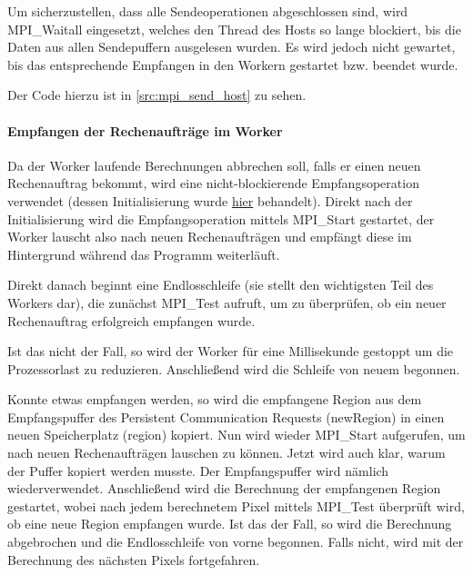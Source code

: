 Um sicherzustellen, dass alle Sendeoperationen abgeschlossen sind, wird MPI\_Waitall eingesetzt, welches den Thread des Hosts so lange blockiert, bis die Daten aus allen Sendepuffern ausgelesen wurden. Es wird jedoch nicht gewartet, bis das entsprechende Empfangen in den Workern gestartet bzw. beendet wurde.

Der Code hierzu ist in \autoref{src:mpi_send_host} zu sehen.

\begin{figure}[h!]
	
\end{figure}

\paragraph{Empfangen der Rechenaufträge im Worker}\label{para:recv_worker}

Da der Worker laufende Berechnungen abbrechen soll, falls er einen neuen Rechenauftrag bekommt, wird eine nicht-blockierende Empfangsoperation verwendet (dessen Initialisierung wurde \hyperref[para:persistent_init]{hier} behandelt). Direkt nach der Initialisierung wird die Empfangsoperation mittels MPI\_Start gestartet, der Worker lauscht also nach neuen Rechenaufträgen und empfängt diese im Hintergrund während das Programm weiterläuft.

Direkt danach beginnt eine Endlosschleife (sie stellt den wichtigsten Teil des Workers dar), die zunächst MPI\_Test aufruft, um zu überprüfen, ob ein neuer Rechenauftrag erfolgreich empfangen wurde.

Ist das nicht der Fall, so wird der Worker für eine Millisekunde gestoppt um die Prozessorlast zu reduzieren. Anschließend wird die Schleife von neuem begonnen.

Konnte etwas empfangen werden, so wird die empfangene Region aus dem Empfangspuffer des Persistent Communication Requests (newRegion) in einen neuen Speicherplatz (region) kopiert. Nun wird wieder MPI\_Start aufgerufen, um nach neuen Rechenaufträgen lauschen zu können. Jetzt wird auch klar, warum der Puffer kopiert werden musste. Der Empfangspuffer wird nämlich wiederverwendet. Anschließend wird die Berechnung der empfangenen Region gestartet, wobei nach jedem berechnetem Pixel mittels MPI\_Test überprüft wird, ob eine neue Region empfangen wurde. Ist das der Fall, so wird die Berechnung abgebrochen und die Endlosschleife von vorne begonnen. Falls nicht, wird mit der Berechnung des nächsten Pixels fortgefahren.


